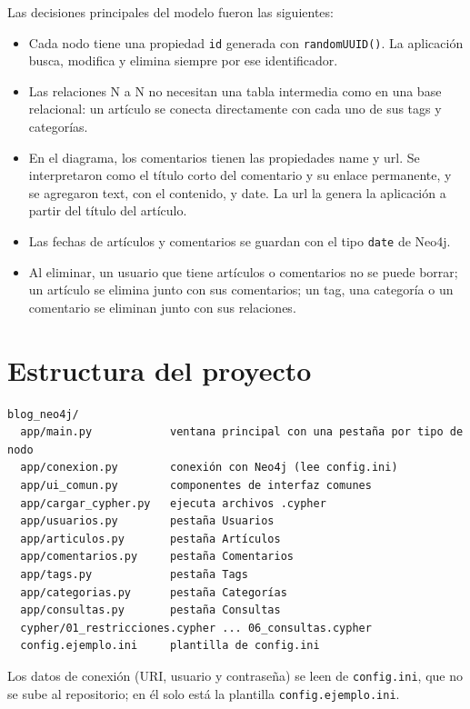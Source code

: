 \documentclass[12pt]{article}
\begin{document}
Las decisiones principales del modelo fueron las siguientes:

\begin{itemize}[itemsep=2pt, topsep=4pt]
    \item Cada nodo tiene una propiedad \texttt{id} generada con \texttt{randomUUID()}. La aplicación busca, modifica y elimina siempre por ese identificador.
    \item Las relaciones N a N no necesitan una tabla intermedia como en una base relacional: un artículo se conecta directamente con cada uno de sus tags y categorías.
    \item En el diagrama, los comentarios tienen las propiedades name y url. Se interpretaron como el título corto del comentario y su enlace permanente, y se agregaron text, con el contenido, y date. La url la genera la aplicación a partir del título del artículo.
    \item Las fechas de artículos y comentarios se guardan con el tipo \texttt{date} de Neo4j.
    \item Al eliminar, un usuario que tiene artículos o comentarios no se puede borrar; un artículo se elimina junto con sus comentarios; un tag, una categoría o un comentario se eliminan junto con sus relaciones.
\end{itemize}

\section{Estructura del proyecto}

\begin{lstlisting}[style=plainStyle]
blog_neo4j/
  app/main.py            ventana principal con una pestaña por tipo de nodo
  app/conexion.py        conexión con Neo4j (lee config.ini)
  app/ui_comun.py        componentes de interfaz comunes
  app/cargar_cypher.py   ejecuta archivos .cypher
  app/usuarios.py        pestaña Usuarios
  app/articulos.py       pestaña Artículos
  app/comentarios.py     pestaña Comentarios
  app/tags.py            pestaña Tags
  app/categorias.py      pestaña Categorías
  app/consultas.py       pestaña Consultas
  cypher/01_restricciones.cypher ... 06_consultas.cypher
  config.ejemplo.ini     plantilla de config.ini
\end{lstlisting}

Los datos de conexión (URI, usuario y contraseña) se leen de \texttt{config.ini}, que no se sube al repositorio; en él solo está la plantilla \texttt{config.ejemplo.ini}.
\end{document}
